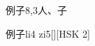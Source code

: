 \begin{entry}{例子}{8,3}{⼈、⼦}
  \begin{phonetics}{例子}{li4 zi5}[][HSK 2]
  \end{phonetics}
\end{entry}
